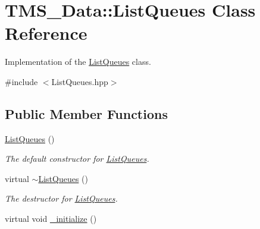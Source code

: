 \hypertarget{classTMS__Data_1_1ListQueues}{
\section{TMS\_\-Data::ListQueues Class Reference}
\label{classTMS__Data_1_1ListQueues}
}


Implementation of the \hyperlink{classTMS__Data_1_1ListQueues}{ListQueues} class.  




{\ttfamily \#include $<$ListQueues.hpp$>$}

\subsection*{Public Member Functions}
\begin{DoxyCompactItemize}
\item 
\hypertarget{classTMS__Data_1_1ListQueues_a39682292acc5da7c74126b57f72d136c}{
\hyperlink{classTMS__Data_1_1ListQueues_a39682292acc5da7c74126b57f72d136c}{ListQueues} ()}
\label{classTMS__Data_1_1ListQueues_a39682292acc5da7c74126b57f72d136c}

\begin{DoxyCompactList}\small\item\em The default constructor for \hyperlink{classTMS__Data_1_1ListQueues}{ListQueues}. \item\end{DoxyCompactList}\item 
\hypertarget{classTMS__Data_1_1ListQueues_a94cb47f5f4e83296944bc2dc1ec342cd}{
virtual \hyperlink{classTMS__Data_1_1ListQueues_a94cb47f5f4e83296944bc2dc1ec342cd}{$\sim$ListQueues} ()}
\label{classTMS__Data_1_1ListQueues_a94cb47f5f4e83296944bc2dc1ec342cd}

\begin{DoxyCompactList}\small\item\em The destructor for \hyperlink{classTMS__Data_1_1ListQueues}{ListQueues}. \item\end{DoxyCompactList}\item 
\hypertarget{classTMS__Data_1_1ListQueues_a0abf6954e85df30991af2b6bf8bb0cfa}{
virtual void \hyperlink{classTMS__Data_1_1ListQueues_a0abf6954e85df30991af2b6bf8bb0cfa}{\_\-initialize} ()}
\label{classTMS__Data_1_1ListQueues_a0abf6954e85df30991af2b6bf8bb0cfa}


\end{DoxyCompactItemize}
